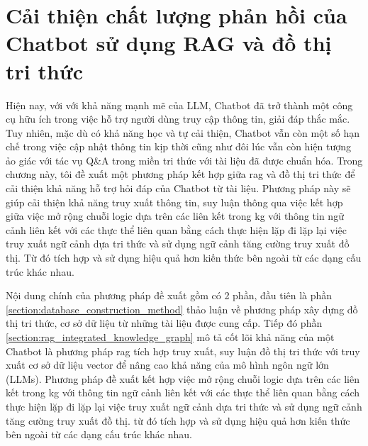 \chapter{Cải thiện chất lượng phản hồi của Chatbot sử dụng RAG và đồ thị tri thức}
\label{chapter:proposed_method}


Hiện nay, với với khả năng mạnh mẽ của LLM, Chatbot đã trở thành một công cụ hữu ích trong việc hỗ trợ người dùng truy cập thông tin, giải đáp thắc mắc. Tuy nhiên, mặc dù có khả năng học và tự cải thiện, Chatbot vẫn còn một số hạn chế trong việc cập nhật thông tin kịp thời cũng như đôi lúc vẫn còn hiện tượng ảo giác với tác vụ Q\&A trong miền tri thức với tài liệu đã được chuẩn hóa. Trong chương này, tôi đề xuất một phương pháp kết hợp giữa \gls{rag} và đồ thị tri thức để cải thiện khả năng hỗ trợ hỏi đáp của Chatbot từ tài liệu. Phương pháp này sẽ giúp cải thiện khả năng truy xuất thông tin, suy luận thông qua việc kết hợp giữa việc mở rộng chuỗi logic dựa trên các liên kết trong \gls{kg} với thông tin ngữ cảnh liên kết với các thực thể liên quan bằng cách thực hiện lặp đi lặp lại việc truy xuất ngữ cảnh dựa tri thức và sử dụng ngữ cảnh tăng cường truy xuất đồ thị. Từ đó tích hợp và sử dụng hiệu quả hơn kiến thức bên ngoài từ các dạng cấu trúc khác nhau.


Nội dung chính của phương pháp đề xuất gồm có 2 phần, đầu tiên là phần \ref{section:database_construction_method} thảo luận về phương pháp xây dựng đồ thị tri thức, cơ sở dữ liệu từ những tài liệu được cung cấp. Tiếp đó phần \ref{section:rag_integrated_knowledge_graph} mô tả cốt lõi khả năng của một Chatbot là phương pháp \gls{rag} tích hợp truy xuất, suy luận đồ thị tri thức với truy xuất cơ sở dữ liệu vector để nâng cao khả năng của mô hình ngôn ngữ lớn (LLMs). Phương pháp đề xuất kết hợp việc mở rộng chuỗi logic dựa trên các liên kết trong \gls{kg} với thông tin ngữ cảnh liên kết với các thực thể liên quan bằng cách thực hiện lặp đi lặp lại việc truy xuất ngữ cảnh dựa tri thức và sử dụng ngữ cảnh tăng cường truy xuất đồ thị. từ đó tích hợp và sử dụng hiệu quả hơn kiến thức bên ngoài từ các dạng cấu trúc khác nhau.


